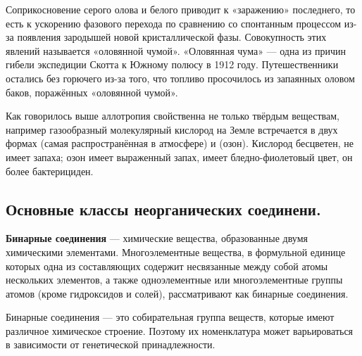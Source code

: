 Соприкосновение серого олова и белого приводит к «заражению» последнего, то есть к ускорению фазового перехода по сравнению со спонтанным процессом из-за появления зародышей новой кристаллической фазы. Совокупность этих явлений называется «оловянной чумой». «Оловянная чума» — одна из причин гибели экспедиции Скотта к Южному полюсу в 1912 году. Путешественники  остались без горючего из-за того, что топливо просочилось из запаянных оловом баков, поражённых «оловянной чумой».

Как говорилось выше аллотропия свойственна не только твёрдым веществам, например газообразный молекулярный кислород на Земле встречается в двух формах  (самая распространённая в атмосфере) и  (озон). Кислород  бесцветен, не имеет запаха; озон имеет выраженный запах, имеет бледно-фиолетовый цвет, он более бактерициден.
\subsection{Основные классы неорганических соединени.}
\textbf{Бинарные соединения} — химические вещества, образованные двумя химическими элементами. Многоэлементные вещества, в формульной единице которых одна из составляющих содержит несвязанные между собой атомы нескольких элементов, а также одноэлементные или многоэлементные группы атомов (кроме гидроксидов и солей), рассматривают как бинарные соединения.

Бинарные соединения — это собирательная группа веществ, которые имеют различное химическое строение. Поэтому их номенклатура может варьироваться в зависимости от генетической принадлежности.

